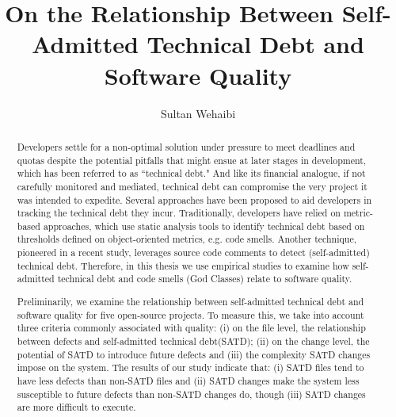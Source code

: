 \documentclass[12pt]{report}
\author{Sultan Wehaibi}
\title {On the Relationship Between Self-Admitted Technical Debt and Software Quality}
\newcommand{\SATD}{self-admitted technical debt\xspace}
\begin{document}
\begin{abstract}
	
	

Developers settle for a non-optimal solution under pressure to meet deadlines and quotas despite the potential pitfalls that might ensue at later stages in development, which has been referred to as ``technical debt." And like its financial analogue, if not carefully monitored and mediated, technical debt can compromise the very project it was intended to expedite. Several approaches have been proposed to aid developers in tracking the technical debt they incur. Traditionally, developers have relied on metric-based approaches, which use static analysis tools to identify technical debt based on thresholds defined on object-oriented metrics, e.g. code smells. Another technique, pioneered in a recent study, leverages source code comments to detect (self-admitted) technical debt. Therefore, in this thesis we use empirical studies to examine how self-admitted technical debt and code smells (God Classes) relate to software quality.

Preliminarily, we examine the relationship between \SATD and software quality for five open-source projects. To measure this, we take into account three criteria commonly associated with quality: (i) on the file level, the relationship between defects and \SATD (SATD); (ii) on the change level, the potential of SATD to introduce future defects and (iii) the complexity SATD changes impose on the system. The results of our study indicate that: (i) SATD files tend to have less defects than non-SATD files and (ii) SATD changes make the system less susceptible to future defects than non-SATD changes do, though (iii) SATD changes are more difficult to execute.


\end{abstract}
\end{document}
